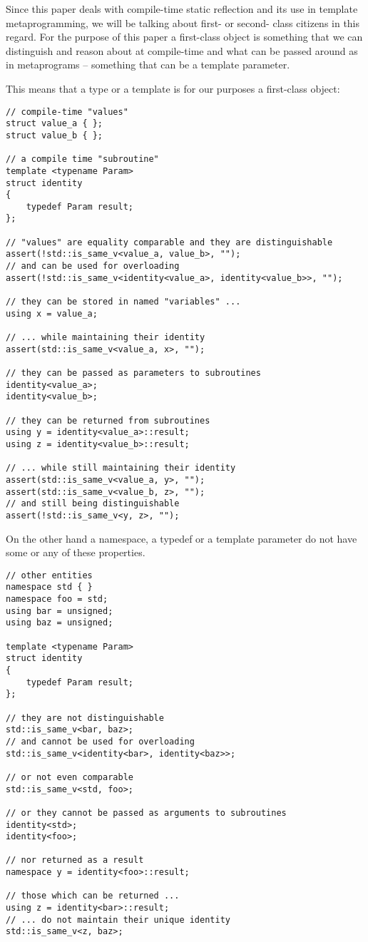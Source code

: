 Since this paper deals with compile-time static reflection and its use
in template metaprogramming, we will be talking about first- or second- class
citizens in this regard. 
For the purpose of this paper a first-class object is something that
we can distinguish and reason about at compile-time and what can be passed around
as  in metaprograms -- something that can be a template parameter.

This means that a type or a template is for our purposes a first-class object:

\begin{verbatim}
// compile-time "values"
struct value_a { };
struct value_b { };

// a compile time "subroutine"
template <typename Param>
struct identity
{
	typedef Param result;
};

// "values" are equality comparable and they are distinguishable
assert(!std::is_same_v<value_a, value_b>, "");
// and can be used for overloading
assert(!std::is_same_v<identity<value_a>, identity<value_b>>, "");

// they can be stored in named "variables" ...
using x = value_a;

// ... while maintaining their identity
assert(std::is_same_v<value_a, x>, "");

// they can be passed as parameters to subroutines
identity<value_a>;
identity<value_b>;

// they can be returned from subroutines
using y = identity<value_a>::result;
using z = identity<value_b>::result;

// ... while still maintaining their identity
assert(std::is_same_v<value_a, y>, "");
assert(std::is_same_v<value_b, z>, "");
// and still being distinguishable
assert(!std::is_same_v<y, z>, "");
\end{verbatim}


On the other hand a namespace, a typedef or a template parameter do not have
some or any of these properties.

\begin{verbatim}
// other entities
namespace std { }
namespace foo = std;
using bar = unsigned;
using baz = unsigned;

template <typename Param>
struct identity
{
	typedef Param result;
};

// they are not distinguishable
std::is_same_v<bar, baz>;
// and cannot be used for overloading
std::is_same_v<identity<bar>, identity<baz>>;

// or not even comparable
std::is_same_v<std, foo>;

// or they cannot be passed as arguments to subroutines
identity<std>;
identity<foo>;

// nor returned as a result
namespace y = identity<foo>::result;

// those which can be returned ...
using z = identity<bar>::result;
// ... do not maintain their unique identity
std::is_same_v<z, baz>;
\end{verbatim}

